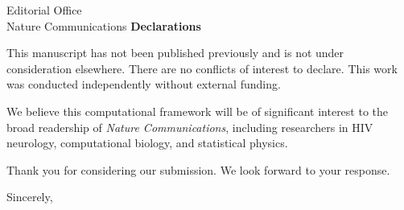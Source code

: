 \documentclass[11pt]{letter}
\begin{document}
\begin{letter}{Editorial Office\\Nature Communications}
\textbf{Declarations}

This manuscript has not been published previously and is not under consideration elsewhere. There are no conflicts of interest to declare. This work was conducted independently without external funding.

We believe this computational framework will be of significant interest to the broad readership of \textit{Nature Communications}, including researchers in HIV neurology, computational biology, and statistical physics.

Thank you for considering our submission. We look forward to your response.

\closing{Sincerely,}

\end{letter}
\end{document}
